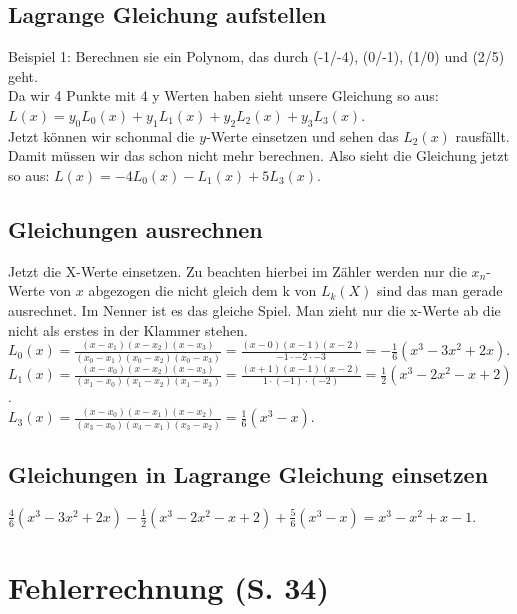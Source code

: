 \documentclass[a4paper, 11pt]{article}
\begin{document}
\subsection{Lagrange Gleichung aufstellen}
Beispiel 1: Berechnen sie ein Polynom, das durch (-1/-4), (0/-1), (1/0)
und (2/5) geht. \\
\newline Da wir 4 Punkte mit 4 y Werten haben sieht unsere Gleichung so aus:\\
\newline $L(x)=y_0L_0(x)+y_1L_1(x)+y_2L_2(x)+y_3L_3(x)$.\\
\newline Jetzt können wir schonmal die $y$-Werte einsetzen und sehen das
$L_2(x)$ rausfällt. Damit müssen wir das schon nicht mehr berechnen.
\newline Also sieht die Gleichung jetzt so aus:
$L(x)=-4L_0(x)-L_1(x)+5L_3(x)$.

\subsection{Gleichungen ausrechnen}
Jetzt die X-Werte einsetzen. Zu beachten hierbei im Zähler werden nur die
$x_n$-Werte von $x$ abgezogen die nicht gleich dem k von $L_k(X)$ sind das man
gerade ausrechnet. Im Nenner ist es das gleiche Spiel. Man zieht nur die x-Werte
ab die nicht als erstes in der Klammer stehen.\\
\newline $L_0(x) = \frac{(x-x_1)(x-x_2)(x-x_3)}{(x_0-x_1)(x_0-x_2)(x_0-x_3)}=
\frac{(x-0)(x-1)(x-2)}{-1 \cdot -2 \cdot -3}=-\frac{1}{6}(x^3-3x^2+2x)$.\\
\newline $L_1(x)= \frac{(x-x_0)(x-x_2)(x-x_3)}{(x_1-x_0)(x_1-x_2)(x_1-x_3)}=
\frac{(x+1)(x-1)(x-2)}{1 \cdot (-1) \cdot (-2)}=\frac{1}{2}(x^3-2x^2-x+2)$.\\
\newline $L_3(x)=
\frac{(x-x_0)(x-x_1)(x-x_2)}{(x_3-x_0)(x_3-x_1)(x_3-x_2)}=\frac{1}{6}(x^3-x)$.\\

\subsection{Gleichungen in Lagrange Gleichung einsetzen}
$\frac{4}{6}(x^3-3x^2+2x)-\frac{1}{2}(x^3-2x^2-x+2)+\frac{5}{6}(x^3-x)=x^3-x^2+x-1$.

\section{Fehlerrechnung (S. 34)}
\end{document}
